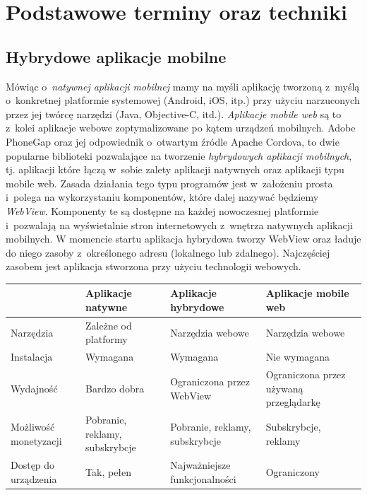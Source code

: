 \documentclass[brudnopis]{xmgr}
\begin{document}
\chapter{Podstawowe terminy oraz techniki}
\section{Hybrydowe aplikacje mobilne}
Mówiąc o~\textit{natywnej aplikacji mobilnej} mamy na myśli aplikację tworzoną z~myślą o~konkretnej platformie systemowej (Android, iOS, itp.) przy użyciu narzuconych przez jej twórcę narzędzi (Java, Objective-C, itd.).  \textit{Aplikacje mobile web} są to z~kolei aplikacje webowe zoptymalizowane po kątem urządzeń mobilnych.
Adobe PhoneGap oraz jej odpowiednik o~otwartym źródle Apache Cordova, to
dwie popularne biblioteki pozwalające na tworzenie \textit{hybrydowych aplikacji
mobilnych}, tj. aplikacji które łączą w~sobie zalety aplikacji natywnych oraz aplikacji
typu mobile web. Zasada działania tego typu programów jest w~założeniu prosta i~polega na wykorzystaniu komponentów, które dalej nazywać będziemy \textit{WebView}.
Komponenty te są dostępne na każdej nowoczesnej platformie i~pozwalają na
wyświetalnie stron internetowych z~wnętrza natywnych aplikacji mobilnych. 
W momencie startu aplikacja hybrydowa tworzy WebView oraz ładuje do niego zasoby z~określonego adresu (lokalnego lub zdalnego). Najczęściej zasobem jest aplikacja stworzona przy użyciu technologii webowych.     


\begin{center}
    \begin{tabularx}{\textwidth}{ | X | X | X | X |}
    \hline & Aplikacje naty\-wne&Aplikacje hybrydowe&Aplikacje mobile web\\ 
    \hline Narzędzia&Zależne od platformy	&Narzędzia webowe&Narzędzia webowe\\
    \hline Instalacja&Wymagana&Wymagana&Nie wymagana\\ 
    \hline Wydajność&Bardzo dobra&Ograniczona przez WebView&Ograniczona przez używaną przeglądarkę\\ 
   \hline Możliwość monetyzacji&Pobranie, reklamy, subskrybcje&Pobranie, reklamy, subskrybcje&Subskrybcje, reklamy\\ 
  \hline Dostęp do urządzenia&Tak, pełen&Najważniejsze funkcjonalności& Ograniczony\\ 
  \hline
  \end{tabularx}
\end{center}
\end{document}
